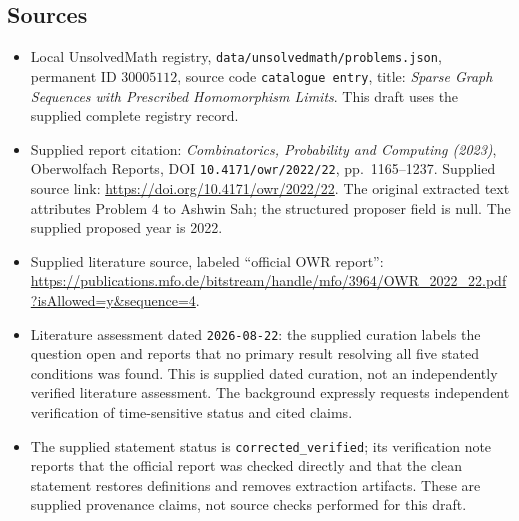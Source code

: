 \documentclass[11pt]{article}
\begin{document}
\subsection{Sources}
\begin{itemize}
\item Local UnsolvedMath registry, \texttt{data/unsolvedmath/problems.json}, permanent ID \(30005112\), source code \texttt{catalogue entry}, title: \emph{Sparse Graph Sequences with Prescribed Homomorphism Limits}. This draft uses the supplied complete registry record.
\item Supplied report citation: \emph{Combinatorics, Probability and Computing (2023)}, Oberwolfach Reports, DOI \texttt{10.4171/owr/2022/22}, pp.\ 1165--1237. Supplied source link: \url{https://doi.org/10.4171/owr/2022/22}. The original extracted text attributes Problem 4 to Ashwin Sah; the structured proposer field is null. The supplied proposed year is 2022.
\item Supplied literature source, labeled ``official OWR report'': \url{https://publications.mfo.de/bitstream/handle/mfo/3964/OWR_2022_22.pdf?isAllowed=y&sequence=4}.
\item Literature assessment dated \texttt{2026-08-22}: the supplied curation labels the question open and reports that no primary result resolving all five stated conditions was found. This is supplied dated curation, not an independently verified literature assessment. The background expressly requests independent verification of time-sensitive status and cited claims.
\item The supplied statement status is \texttt{corrected\_verified}; its verification note reports that the official report was checked directly and that the clean statement restores definitions and removes extraction artifacts. These are supplied provenance claims, not source checks performed for this draft.
\end{itemize}
\end{document}
